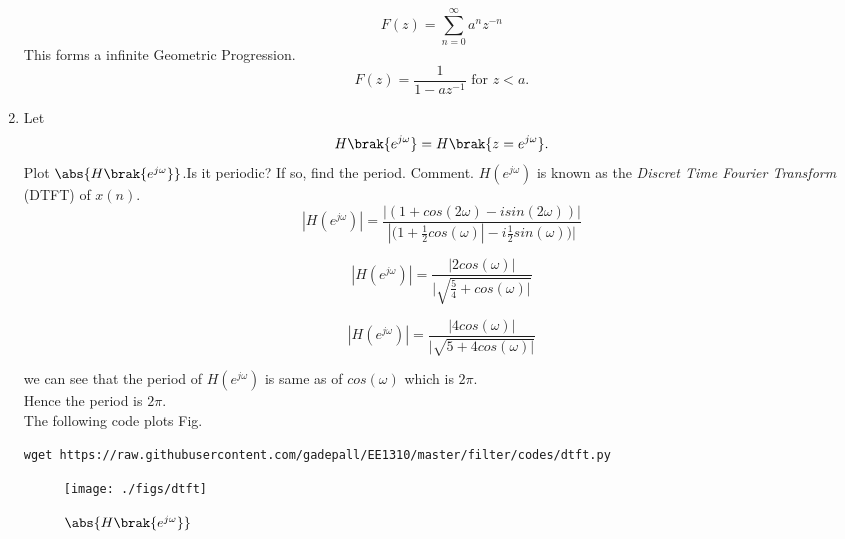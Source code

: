 \documentclass[journal,12pt,twocolumn]{IEEEtran}
\renewcommand\thesection{\arabic{section}}
\begin{document}
\begin{enumerate}[label=\thesection.\arabic*]
\begin{equation}
    F(z) = \sum_{n=0}^{\infty} a^{n}z^{-n}
\end{equation}
This forms a infinite Geometric Progression.
\begin{equation}
    F(z) = \frac{1}{1-az^{-1}} \text{ for } z<a.
\end{equation}
\item 
Let
\begin{equation}
H\brak{e^{j \omega}} = H\brak{z = e^{j \omega}}.
\end{equation}
Plot $\abs{H\brak{e^{j \omega}}}$.Is it periodic? If so, find the period. Comment.  $H(e^{j \omega})$ is
known as the {\em Discret Time Fourier Transform} (DTFT) of $x(n)$.
\\
\solution 
\begin{equation}
    |H(e^{j \omega})| = \frac{|(1+cos(2\omega)- i sin(2 \omega))|}{|(1+\frac{1}{2}cos(\omega)|- i\frac{1}{2}sin(\omega))|}
\end{equation}

\begin{equation}
    |H(e^{j \omega})| = \frac{|2cos(\omega)|}{|\sqrt{\frac{5}{4} + cos(\omega)|}}
\end{equation}

\begin{equation}
    |H(e^{j \omega})| = \frac{|4cos(\omega)|}{|\sqrt{5+ 4cos(\omega)|}}
\end{equation}

we can see that the period of $H(e^{j \omega})$ is same as of $cos(\omega)$ which is $2\pi$. \\
Hence the period is $2\pi$.\\
The following code plots Fig.
\begin{lstlisting}
wget https://raw.githubusercontent.com/gadepall/EE1310/master/filter/codes/dtft.py
\end{lstlisting}
\begin{figure}[!ht]
\centering
\texttt{[image: ./figs/dtft]}
\caption{$\abs{H\brak{e^{j\omega}}}$}
\label{fig:dtft}
\end{figure}


\end{enumerate}
\end{document}

